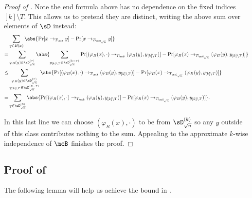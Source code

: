 \begin{proof}[Proof of ]
Note the end formula above has no dependence on the fixed indices $[k] \setminus T$. This allows us to pretend they are distinct, writing the above sum over elements of $\sD$ instead:
\begin{align*}
    &\sum_{y \in B(x)} \abs{\Pr[x \to_{T_\mcB} y] - \Pr[x \to_{T_{\mcG_{\sqrt{n}}}} y]}\\
    =& \sum_{\varphi_B(y) \in \sD_{\sqrt{n}}^{(\tau)}} \abs{\sum_{y_{[k] \setminus T} \in \sD_{\sqrt{n}}^{(k-\tau)}}\Pr[(\varphi_B(x), \cdot) \to_{T_\mcB} (\varphi_B(y), y_{[k] \setminus T})] - \Pr[\varphi_B(x) \to_{T_{\mcG_{\sqrt{n}}}} (\varphi_B(y), y_{[k] \setminus T})]}\\
    \leq& \sum_{\substack{\varphi_B(y) \in \sD_{\sqrt{n}}^{(\tau)} \\ y_{[k] \setminus T} \in \sD_{\sqrt{n}}^{(k-\tau)}}} \abs{\Pr[(\varphi_B(x), \cdot) \to_{T_\mcB} (\varphi_B(y), y_{[k] \setminus T})] - \Pr[\varphi_B(x) \to_{T_{\mcG_{\sqrt{n}}}} (\varphi_B(y), y_{[k] \setminus T})]}\\
    =& \sum_{y \in \sD^{(k)}_{\sqrt{n}}} \abs{\Pr[(\varphi_B(x), \cdot) \to_{T_\mcB} (\varphi_B(y), y_{[k] \setminus T})] - \Pr[\varphi_B(x) \to_{T_{\mcG_{\sqrt{n}}}} (\varphi_B(y), y_{[k] \setminus T})]}.
\end{align*}

In this last line we can choose $(\varphi_B(x), \cdot)$ to be from $\sD^{(k)}_{\sqrt{n}}$ so any $y$ outside of this class contributes nothing to the sum. Appealing to the approximate $k$-wise independence of $\mcB$ finishes the proof.
\end{proof}

\subsection{Proof of }
\label{subsec:inductiontrick}

The following lemma will help us achieve the bound in .

